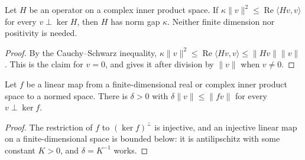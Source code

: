 \begin{lemma}
    \label{lem:gap_energy_to_norm}
    \leanok
    Let $H$ be an operator on a complex inner product space. If
    $\kappa\lVert v\rVert^2\le\operatorname{Re}\langle Hv,v\rangle$ for every
    $v\perp\ker H$, then $H$ has norm gap $\kappa$. Neither finite dimension nor
    positivity is needed.
\end{lemma}
\begin{proof}\leanok
    By the Cauchy--Schwarz inequality,
    $\kappa\lVert v\rVert^2\le\operatorname{Re}\langle Hv,v\rangle
        \le\lVert Hv\rVert\lVert v\rVert$. This is the claim for $v=0$, and gives it
    after division by $\lVert v\rVert$ when $v\neq0$.
\end{proof}

\begin{lemma}
    \label{lem:gap_orthogonal_kernel}
    \leanok
    Let $f$ be a linear map from a finite-dimensional real or complex inner product
    space to a normed space. There is $\delta>0$ with
    $\delta\lVert v\rVert\le\lVert fv\rVert$ for every $v\perp\ker f$.
\end{lemma}
\begin{proof}\leanok
    The restriction of $f$ to $(\ker f)^\perp$ is injective, and an injective linear
    map on a finite-dimensional space is bounded below: it is antilipschitz with
    some constant $K>0$, and $\delta=K^{-1}$ works.
\end{proof}

